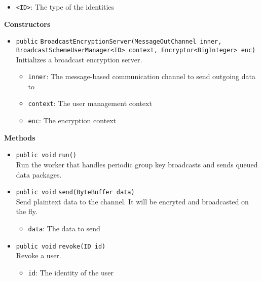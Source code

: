 \begin{itemize}
\item \lstinline|<ID>|: The type of the identities
\end{itemize}


\textbf{Constructors}
\begin{itemize}
\item \lstinline|public| \lstinline|BroadcastEncryptionServer|\lstinline|(MessageOutChannel inner, BroadcastSchemeUserManager<ID> context, Encryptor<BigInteger> enc)|\\
Initializes a broadcast encryption server.
\begin{itemize}
\item \lstinline|inner|: The message-based communication channel to send outgoing data to
\item \lstinline|context|: The user management context
\item \lstinline|enc|: The encryption context
\end{itemize}



\end{itemize}


\textbf{Methods}
\begin{itemize}
\item \lstinline|public void| \lstinline|run|\lstinline|()|\\
Run the worker that handles periodic group key broadcasts and sends
 queued data packages.



\item \lstinline|public void| \lstinline|send|\lstinline|(ByteBuffer data)|\\
Send plaintext data to the channel. It will be encryted and broadcasted
 on the fly.
\begin{itemize}
\item \lstinline|data|: The data to send
\end{itemize}



\item \lstinline|public void| \lstinline|revoke|\lstinline|(ID id)|\\
Revoke a user.
\begin{itemize}
\item \lstinline|id|: The identity of the user
\end{itemize}



\end{itemize}

